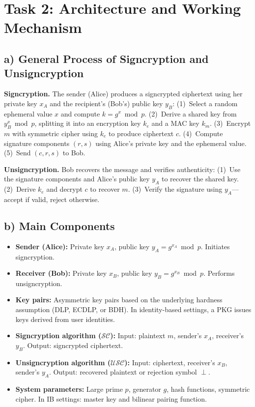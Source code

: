 \documentclass[11pt,a4paper]{article}
\begin{document}
\section{Task 2: Architecture and Working Mechanism}

\subsection{a) General Process of Signcryption and Unsigncryption}

\textbf{Signcryption.} The sender (Alice) produces a signcrypted ciphertext using her private key $x_A$ and the recipient's (Bob's) public key $y_B$:
(1)~Select a random ephemeral value $x$ and compute $k = g^x \bmod p$.
(2)~Derive a shared key from $y_B^x \bmod p$, splitting it into an encryption key $k_e$ and a MAC key $k_m$.
(3)~Encrypt $m$ with symmetric cipher using $k_e$ to produce ciphertext $c$.
(4)~Compute signature components $(r, s)$ using Alice's private key and the ephemeral value.
(5)~Send $(c, r, s)$ to Bob.

\textbf{Unsigncryption.} Bob recovers the message and verifies authenticity:
(1)~Use the signature components and Alice's public key $y_A$ to recover the shared key.
(2)~Derive $k_e$ and decrypt $c$ to recover $m$.
(3)~Verify the signature using $y_A$---accept if valid, reject otherwise.

\subsection{b) Main Components}

\begin{itemize}
    \item \textbf{Sender (Alice):} Private key $x_A$, public key $y_A = g^{x_A} \bmod p$. Initiates signcryption.
    \item \textbf{Receiver (Bob):} Private key $x_B$, public key $y_B = g^{x_B} \bmod p$. Performs unsigncryption.
    \item \textbf{Key pairs:} Asymmetric key pairs based on the underlying hardness assumption (DLP, ECDLP, or BDH). In identity-based settings, a PKG issues keys derived from user identities.
    \item \textbf{Signcryption algorithm ($\mathcal{SC}$):} Input: plaintext $m$, sender's $x_A$, receiver's $y_B$. Output: signcrypted ciphertext.
    \item \textbf{Unsigncryption algorithm ($\mathcal{USC}$):} Input: ciphertext, receiver's $x_B$, sender's $y_A$. Output: recovered plaintext or rejection symbol $\perp$.
    \item \textbf{System parameters:} Large prime $p$, generator $g$, hash functions, symmetric cipher. In IB settings: master key and bilinear pairing function.
\end{itemize}
\end{document}
